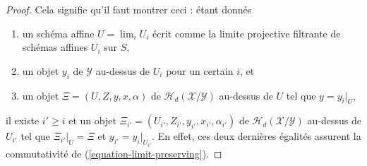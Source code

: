 \begin{proof}
Cela signifie qu'il faut montrer ceci : étant donnés
\begin{enumerate}
\item un schéma affine $U = \lim_i U_i$ écrit comme la
limite projective filtrante de schémas affines $U_i$ sur $S$,
\item un objet $y_i$ de $\mathcal{Y}$ au-dessus de $U_i$ pour un certain $i$, et
\item un objet $\Xi = (U, Z, y, x, \alpha)$ de
$\mathcal{H}_d(\mathcal{X}/\mathcal{Y})$
au-dessus de $U$ tel que $y = y_i|_U$,
\end{enumerate}
il existe $i' \geq i$ et un objet
$\Xi_{i'} = (U_{i'}, Z_{i'}, y_{i'}, x_{i'}, \alpha_{i'})$ de
$\mathcal{H}_d(\mathcal{X}/\mathcal{Y})$ au-dessus de $U_{i'}$ tel que
$\Xi_{i'}|_U = \Xi$ et $y_{i'} = y_i|_{U_{i'}}$.
En effet, ces deux dernières égalités assurent la commutativité de
(\ref{equation-limit-preserving}).


\end{proof}
